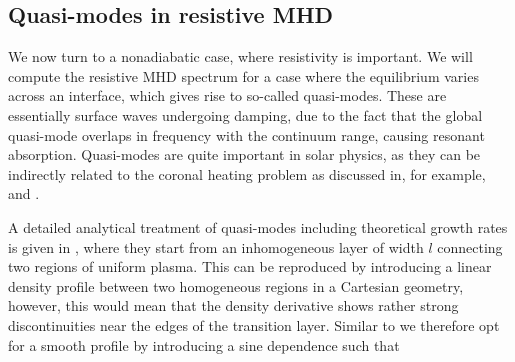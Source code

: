 \subsection{Quasi-modes in resistive MHD}
We now turn to a nonadiabatic case, where resistivity is important. We will compute the resistive MHD spectrum for a case where the equilibrium varies across an interface, which gives rise to so-called quasi-modes. These are essentially surface waves undergoing damping, due to the fact that the global quasi-mode overlaps in frequency with the continuum range, causing resonant absorption. Quasi-modes are quite important in solar physics, as they can be indirectly related to the coronal heating problem as discussed in, for example, \citet{poedts1989} and \citet{poedts1991}.

A detailed analytical treatment of quasi-modes including theoretical growth rates is given in \citet{book_priest}, where they start from an inhomogeneous layer of width $l$ connecting two regions of uniform plasma. This can be reproduced by introducing a linear density profile between two homogeneous regions in a Cartesian geometry, however, this would mean that the density derivative shows rather strong discontinuities near the edges of the transition layer. Similar to \citet{ruderman2002} we therefore opt for a smooth profile by introducing a sine dependence such that


